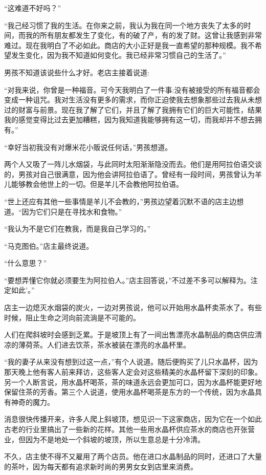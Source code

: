 \documentclass[twoside,openany]{book}
\begin{document}
“这难道不好吗？”

“我己经习惯了我的生活。在你来之前，我认为我在同一个地方丧失了太多的时间，而我的所有朋友都发生了变化，有的破了产，有的发了财。这曾让我感到非常难过。现在我明白了不必如此。商店的大小正好是我一直希望的那种规模。我不希望发生变化，因为我不知道如何变化。我已经非常习惯自己的生活了。”

男孩不知道该说些什么才好。老店主接着说道:

“对我来说，你曾是一种福音。可今天我明白了一件事:没有被接受的所有福音都会变成一种诅咒。我对生活没有更多的需求，而你正迫使我去想象那些过去我从未想过的财富与前景。现在我了解了它们，并且了解了我拥有它们的巨大可能性，结果我的感觉变得比过去更加糟糕，因为我知道我能够拥有这一切，而我却并不想去拥有。”

“幸好当初我没有对爆米花小贩说任何话，”男孩想道。

两个人又吸了一阵儿水烟袋，与此同时太阳渐渐隐没而去。他们是用阿拉伯语交谈的，男孩对自己很满意，因为他会讲阿拉伯语了。曾经有一段时间，男孩曾认为羊儿能够教会他世上的一切。但是羊儿不会教他阿拉伯语。

“世上还应有其他一些事情是羊儿不会教的，”男孩边望着沉默不语的店主边想道。“因为它们只是在寻找水和食物。”

“我认为不是它们在教我，而是我自己学习的。”

“马克图伯。”店主最终说道。

“什么意思？”

“要想弄懂它你就必须要生为阿拉伯人。”店主回答说，”不过差不多可以解释为。注定如此'。”

店主一边熄灭水烟袋的炭火，一边对男孩说，他可以开始用水晶杯卖茶水了。有些时候，阻止生命之河向前流淌是不可能的。

人们在爬斜坡时会感到乏累。于是坡顶上有了一间出售漂亮水晶制品的商店供应清凉的薄荷茶。人们进去饮茶，茶水被装在漂亮的水晶杯里。

“我的妻子从来没有想到过这一点，”有个人说道。随后便购买了儿只水晶杯，因为那天晚上他有客人前来拜访，这些客人定会对这些精美的水晶杯留下深刻的印象。另一个人断言说，用水晶杯喝茶，茶的味道永远会更加可口，因为水晶杯能更好地保留住茶的芳香。第三个人说道，使用水晶杯喝茶是东方的一个传统，因为水晶具有神奇的魔力。

消息很快传播开来，许多人爬上斜坡顶，想见识一下这家商店，因为它在一个如此古老的行业里搞出了一些新的花样。其他一些用水晶杯供应茶水的商店也开张营业，但因为不是地处一个斜坡的坡顶，所以生意总是十分冷清。

不久，店主使不得不又雇用了两个店员。他在进口水晶制品的同时，还进口了大量的茶叶，因为每天都有追求新时尚的男男女女到店里来消费。
\end{document}
